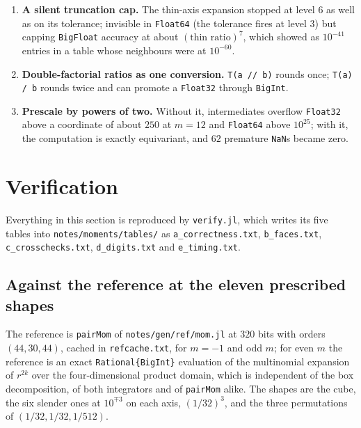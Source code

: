 \documentclass[11pt]{article}
\theoremstyle{remark}
\newcommand{\code}[1]{\texttt{#1}}
\begin{document}
\begin{enumerate}[nosep]
only the $m = -1$ base, so an even $m$ recursed forever; found when the cross-check first
ran at even $m$.
\item \textbf{A silent truncation cap.} The thin-axis expansion stopped at level $6$ as
well as on its tolerance; invisible in \code{Float64} (the tolerance fires at level $3$)
but capping \code{BigFloat} accuracy at about $(\text{thin ratio})^7$, which showed as
$10^{-41}$ entries in a table whose neighbours were at $10^{-60}$.
\item \textbf{Double-factorial ratios as one conversion.} \code{T(a // b)} rounds once;
\code{T(a) / b} rounds twice and can promote a \code{Float32} through \code{BigInt}.
\item \textbf{Prescale by powers of two.} Without it, intermediates overflow
\code{Float32} above a coordinate of about $250$ at $m = 12$ and \code{Float64} above
$10^{25}$; with it, the computation is exactly equivariant, and $62$ premature \code{NaN}s
became zero.
\end{enumerate}

\section{Verification}
\label{sec:verify}

Everything in this section is reproduced by \code{verify.jl}, which writes its five tables
into \code{notes/moments/tables/} as \code{a\_correctness.txt}, \code{b\_faces.txt},
\code{c\_crosschecks.txt}, \code{d\_digits.txt} and \code{e\_timing.txt}.

\subsection{Against the reference at the eleven prescribed shapes}

The reference is \code{pairMom} of \code{notes/gen/ref/mom.jl} at $320$ bits with orders
$(44,30,44)$, cached in \code{refcache.txt}, for $m = -1$ and odd $m$; for even $m$ the
reference is an exact \code{Rational\{BigInt\}} evaluation of the multinomial expansion of
$r^{2k}$ over the four-dimensional product domain, which is independent of the box
decomposition, of both integrators and of \code{pairMom} alike. The shapes are the cube,
the six slender ones at $10^{\mp3}$ on each axis, $(1/32)^3$, and the three permutations of
$(1/32, 1/32, 1/512)$.
\end{document}
